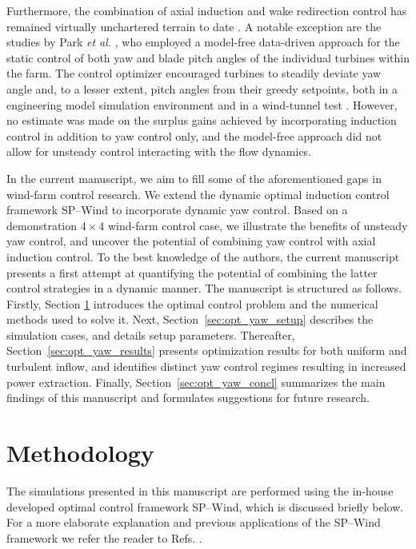 \documentclass[energies,article,submit,moreauthors,latex,10pt,a4paper]{mdpi}
\begin{document}
Furthermore, the combination of axial induction and wake redirection control has remained virtually unchartered terrain to date \cite{boersma2017tutorial}. A notable exception are the studies by Park \emph{et al.} \cite{park2015cooperative, park2017data}, who employed a model-free data-driven approach for the static control of both yaw and blade pitch angles of the individual turbines within the farm. The control optimizer encouraged turbines to steadily deviate yaw angle and, to a lesser extent, pitch angles from their greedy setpoints, both in a engineering model simulation environment \cite{park2015cooperative, park2016data} and in a wind-tunnel test \cite{park2017data}. However, no estimate was made on the surplus gains achieved by incorporating induction control in addition to yaw control only, and the model-free approach did not allow for unsteady control interacting with the flow dynamics. 

In the current manuscript, we aim to fill some of the aforementioned gaps in wind-farm control research. We extend the dynamic optimal induction control framework SP--Wind \cite{goit2015optimal, munters2017optimal} to incorporate dynamic yaw control. Based on a demonstration $4 \times 4$ wind-farm control case, we illustrate the benefits of unsteady yaw control, and uncover the potential of combining yaw control with axial induction control. To the best knowledge of the authors, the current manuscript presents a first attempt at quantifying the potential of combining the latter control strategies in a dynamic manner. 
The manuscript is structured as follows. Firstly, Section \ref{sec:meth} introduces the optimal control problem and the numerical methods used to solve it. Next, Section~\ref{sec:opt_yaw_setup} describes the simulation cases, and details setup parameters. Thereafter, Section~\ref{sec:opt_yaw_results} presents optimization results for both uniform and turbulent inflow, and identifies distinct yaw control regimes resulting in increased power extraction. Finally, Section~\ref{sec:opt_yaw_concl} summarizes the main findings of this manuscript and formulates suggestions for future research. 

\section{Methodology}\label{sec:meth}
\noindent The simulations presented in this manuscript are performed using the in-house developed optimal control framework SP--Wind, which is discussed briefly below. For a more elaborate explanation and previous applications of the SP--Wind framework we refer the reader to Refs. \cite{delport2009constrained, goit2015optimal, nita2016efficiency, goit2016optimal, munters2017optimal}.  
\end{document}
